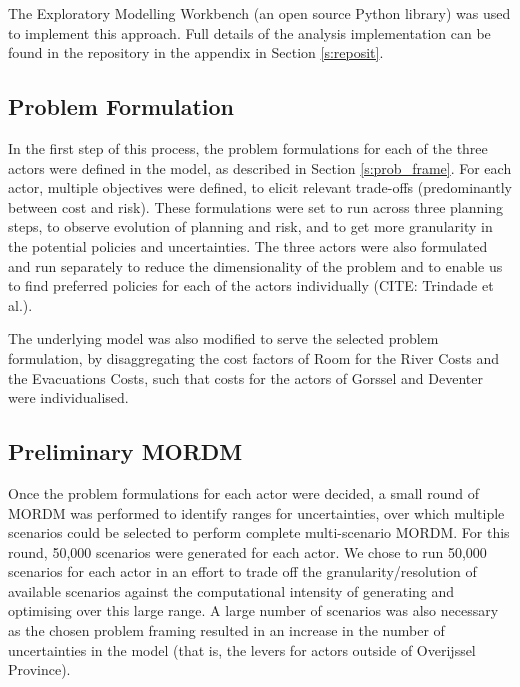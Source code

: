 The Exploratory Modelling Workbench (an open source Python library) was used to implement this approach. Full details of the analysis implementation can be found in the repository in the appendix in Section \ref{s:reposit}.

\subsection{Problem Formulation}
In the first step of this process, the problem formulations for each of the three actors were defined in the model, as described in Section \ref{s:prob_frame}. For each actor, multiple objectives were defined, to elicit relevant trade-offs (predominantly between cost and risk). These formulations were set to run across three planning steps, to observe evolution of planning and risk, and to get more granularity in the potential policies and uncertainties. The three actors were also formulated and run separately to reduce the dimensionality of the problem and to enable us to find preferred policies for each of the actors individually (CITE: Trindade et al.).

The underlying model was also modified to serve the selected problem formulation, by disaggregating the cost factors of Room for the River Costs and the Evacuations Costs, such that costs for the actors of Gorssel and Deventer were individualised.

\subsection{Preliminary MORDM}
Once the problem formulations for each actor were decided, a small round of MORDM was performed to identify ranges for uncertainties, over which multiple scenarios could be selected to perform complete multi-scenario MORDM. For this round, 50,000 scenarios were generated for each actor. We chose to run 50,000 scenarios for each actor in an effort to trade off the granularity/resolution of available scenarios against the computational intensity of generating and optimising over this large range. A large number of scenarios was also necessary as the chosen problem framing resulted in an increase in the number of uncertainties in the model (that is, the levers for actors outside of Overijssel Province).

